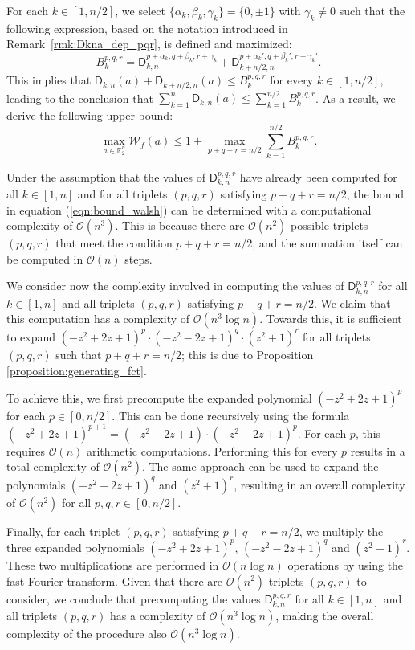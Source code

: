 \documentclass[runningheads,orivec]{llncs}
\newcommand{\Dkna}[3]{\mathsf{D}_{#2,#1}(a)}
\newcommand{\F}{\mathbb{F}}
\newcommand{\wt}[1]{\mathcal W_{#1}}
\let\leq=\leqslant
\begin{document}
    For each $k\in[1,n/2]$, we select $\{\alpha_k,\beta_k,\gamma_k\}=\{0,\pm 1\}$ with $\gamma_k\neq 0$ such that the following expression, based on the notation introduced in Remark~\ref{rmk:Dkna_dep_pqr}, is defined and maximized:
    \[
    	B_k^{p,q,r}=\mathsf D_{k,n}^{p+\alpha_k,q+\beta_k,r+\gamma_k}+\mathsf D_{k+n/2,n}^{p+\alpha_k',q+\beta_k',r+\gamma_k'}.
    \]
    This implies that $\Dkna{n}{k}{b_k}+\Dkna{n}{k+n/2}{b_{k+n/2}}\leq B_k^{p,q,r}$ for every $k\in[1,n/2]$, leading to the conclusion that $\sum_{k=1}^n\Dkna nk{b_k}\leq\sum_{k=1}^{n/2} B_k^{p,q,r}$. As a result, we derive the following upper bound:
    \begin{equation}\label{eqn:bound_walsh}
    	\max_{a\in\F_2^n}\wt f(a)\leq 1+\max_{p+q+r=n/2}\sum_{k=1}^{n/2} B_k^{p,q,r}.
    \end{equation}
    
    Under the assumption that the values of $\mathsf{D}_{k,n}^{p,q,r}$ have already been computed for all $k\in[1,n]$ and for all triplets $(p,q,r)$ satisfying $p+q+r=n/2$, the bound in equation (\ref{eqn:bound_walsh}) can be determined with a computational complexity of $\mathcal{O}(n^3)$. This is because there are $\mathcal{O}(n^2)$ possible triplets $(p,q,r)$ that meet the condition $p+q+r=n/2$, and the summation itself can be computed in $\mathcal{O}(n)$ steps.
    
    We consider now the complexity involved in computing the values of $\mathsf{D}_{k,n}^{p,q,r}$ for all $k\in[1,n]$ and all triplets $(p,q,r)$ satisfying $p+q+r=n/2$. We claim that this computation has a complexity of $\mathcal{O}(n^3 \log n)$. Towards this, it is sufficient to expand $(-z^2 + 2z + 1)^p\cdot (-z^2 - 2z + 1)^q\cdot (z^2 + 1)^r$ for all triplets $(p,q,r)$ such that $p+q+r=n/2$; this is due to Proposition \ref{proposition:generating_fct}.
    
    To achieve this, we first precompute the expanded polynomial $(-z^2 + 2z + 1)^p$ for each $p\in[0,n/2]$. This can be done recursively using the formula $(-z^2 + 2z + 1)^{p+1} = (-z^2 + 2z + 1)\cdot (-z^2 + 2z + 1)^p$. For each $p$, this requires $\mathcal O(n)$ arithmetic computations. Performing this for every $p$ results in a total complexity of $\mathcal{O}(n^2)$. The same approach can be used to expand the polynomials $(-z^2 - 2z + 1)^q$ and $(z^2 + 1)^r$, resulting in an overall complexity of $\mathcal{O}(n^2)$ for all $p,q,r\in[0,n/2]$. 
    
    Finally, for each triplet $(p,q,r)$ satisfying $p+q+r=n/2$, we multiply the three expanded polynomials $(-z^2 + 2z + 1)^p$, $(-z^2 - 2z + 1)^q$ and $(z^2 + 1)^r$. These two multiplications are performed in $\mathcal{O}(n \log n)$ operations by using the fast Fourier transform. Given that there are $\mathcal{O}(n^2)$ triplets $(p,q,r)$ to consider, we conclude that precomputing the values $\mathsf{D}_{k,n}^{p,q,r}$ for all $k\in[1,n]$ and all triplets $(p,q,r)$ has a complexity of $\mathcal{O}(n^3 \log n)$, making the overall complexity of the procedure also $\mathcal{O}(n^3 \log n)$.
    
\end{document}
